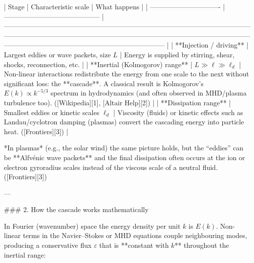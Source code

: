 | Stage                           | Characteristic scale                       | What happens                                                                                                                                                                                                                                                                                    |
| ------------------------------- | ------------------------------------------ | ----------------------------------------------------------------------------------------------------------------------------------------------------------------------------------------------------------------------------------------------------------------------------------------------- |
| **Injection / driving**         | Largest eddies or wave packets, size $L$   | Energy is supplied by stirring, shear, shocks, reconnection, etc.                                                                                                                                                                                                                               |
| **Inertial (Kolmogorov) range** | $L \gg \ell \gg \ell_d$                    | Non-linear interactions redistribute the energy from one scale to the next without significant loss: the **cascade**. A classical result is Kolmogorov’s $E(k)\propto k^{-5/3}$ spectrum in hydrodynamics (and often observed in MHD/plasma turbulence too). ([Wikipedia][1], [Altair Help][2]) |
| **Dissipation range**           | Smallest eddies or kinetic scales $\ell_d$ | Viscosity (fluids) or kinetic effects such as Landau/cyclotron damping (plasmas) convert the cascading energy into particle heat. ([Frontiers][3])                                                                                                                                              |

*In plasmas* (e.g., the solar wind) the same picture holds, but the “eddies” can be **Alfvénic wave packets** and the final dissipation often occurs at the ion or electron gyroradius scales instead of the viscous scale of a neutral fluid. ([Frontiers][3])

---

### 2.  How the cascade works mathematically

In Fourier (wavenumber) space the energy density per unit $k$ is $E(k)$.  Non-linear terms in the Navier–Stokes or MHD equations couple neighbouring modes, producing a conservative flux $\varepsilon$ that is **constant with $k$** throughout the inertial range:

